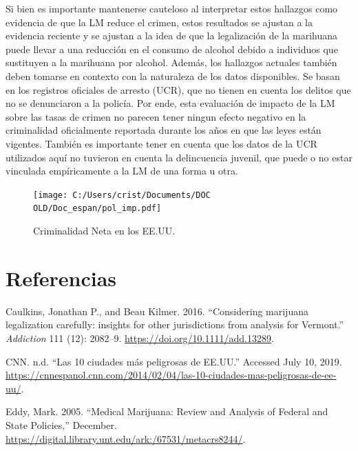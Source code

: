 \documentclass[11pt,]{article}
\begin{document}
Si bien es importante mantenerse cauteloso al interpretar estos
hallazgos como evidencia de que la LM reduce el crimen, estos resultados
se ajustan a la evidencia reciente y se ajustan a la idea de que la
legalización de la marihuana puede llevar a una reducción en el consumo
de alcohol debido a individuos que sustituyen a la marihuana por
alcohol. Además, los hallazgos actuales también deben tomarse en
contexto con la naturaleza de los datos disponibles. Se basan en los
registros oficiales de arresto (UCR), que no tienen en cuenta los
delitos que no se denunciaron a la policía. Por ende, esta evaluación de
impacto de la LM sobre las tasas de crimen no parecen tener ningun
efecto negativo en la criminalidad oficialmente reportada durante los
años en que las leyes están vigentes. También es importante tener en
cuenta que los datos de la UCR utilizados aquí no tuvieron en cuenta la
delincuencia juvenil, que puede o no estar vinculada empíricamente a la
LM de una forma u otra.

\begin{figure}
\centering
\texttt{[image: C:/Users/crist/Documents/DOC OLD/Doc\_espan/pol\_imp.pdf]}
\caption{\label{fig:plot2} Criminalidad Neta en los EE.UU.}
\end{figure}

\newpage

\hypertarget{referencias}{%
\section{Referencias}\label{referencias}}

\setlength{\parindent}{-0.2in}
\setlength{\leftskip}{0.2in}
\setlength{\parskip}{8pt}
\vspace*{-0.2in}

\noindent

\hypertarget{refs}{}
\leavevmode\hypertarget{ref-Caulkins2016}{}%
Caulkins, Jonathan P., and Beau Kilmer. 2016. ``Considering marijuana
legalization carefully: insights for other jurisdictions from analysis
for Vermont.'' \emph{Addiction} 111 (12): 2082--9.
\url{https://doi.org/10.1111/add.13289}.

\leavevmode\hypertarget{ref-CNN}{}%
CNN. n.d. ``Las 10 ciudades más peligrosas de EE.UU.'' Accessed July 10,
2019.
\url{https://cnnespanol.cnn.com/2014/02/04/las-10-ciudades-mas-peligrosas-de-ee-uu/}.

\leavevmode\hypertarget{ref-Eddy2005}{}%
Eddy, Mark. 2005. ``Medical Marijuana: Review and Analysis of Federal
and State Policies,'' December.
\url{https://digital.library.unt.edu/ark:/67531/metacrs8244/}.
\end{document}
